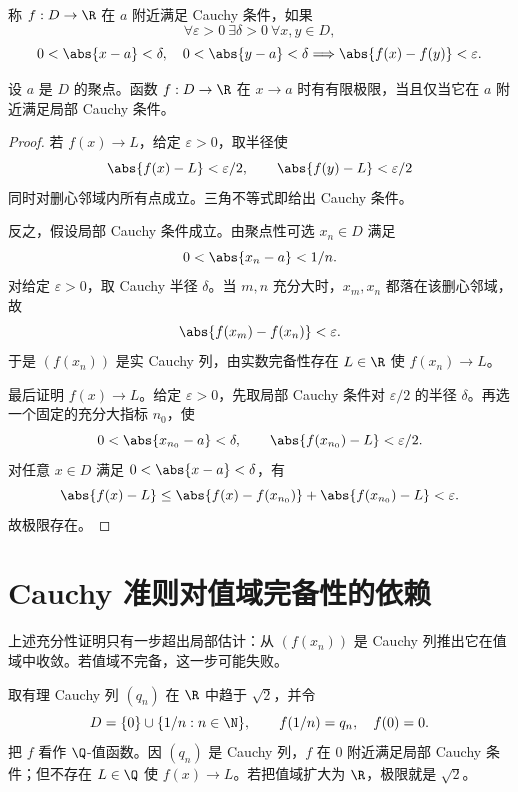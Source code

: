 \begin{definition}[局部 Cauchy 条件]
称 \(f:D\to\R\) 在 \(a\) 附近满足 Cauchy 条件，如果
\[
 \forall\varepsilon>0\ \exists\delta>0\ \forall x,y\in D,
\]
\[
 0<\abs{x-a}<\delta,\quad0<\abs{y-a}<\delta
 \Longrightarrow\abs{f(x)-f(y)}<\varepsilon.
\]
\end{definition}

\begin{theorem}
设 \(a\) 是 \(D\) 的聚点。函数 \(f:D\to\R\) 在 \(x\to a\) 时有有限极限，当且仅当它在 \(a\) 附近满足局部 Cauchy 条件。
\end{theorem}

\begin{proof}
若 \(f(x)\to L\)，给定 \(\varepsilon>0\)，取半径使
\[
 \abs{f(x)-L}<\varepsilon/2,\qquad
 \abs{f(y)-L}<\varepsilon/2
\]
同时对删心邻域内所有点成立。三角不等式即给出 Cauchy 条件。

反之，假设局部 Cauchy 条件成立。由聚点性可选 \(x_n\in D\) 满足
\[
 0<\abs{x_n-a}<1/n.
\]
对给定 \(\varepsilon>0\)，取 Cauchy 半径 \(\delta\)。当 \(m,n\) 充分大时，\(x_m,x_n\) 都落在该删心邻域，故
\[
 \abs{f(x_m)-f(x_n)}<\varepsilon.
\]
于是 \((f(x_n))\) 是实 Cauchy 列，由实数完备性存在 \(L\in\R\) 使 \(f(x_n)\to L\)。

最后证明 \(f(x)\to L\)。给定 \(\varepsilon>0\)，先取局部 Cauchy 条件对 \(\varepsilon/2\) 的半径 \(\delta\)。再选一个固定的充分大指标 \(n_0\)，使
\[
 0<\abs{x_{n_0}-a}<\delta,\qquad
 \abs{f(x_{n_0})-L}<\varepsilon/2.
\]
对任意 \(x\in D\) 满足 \(0<\abs{x-a}<\delta\)，有
\[
 \abs{f(x)-L}
 \le\abs{f(x)-f(x_{n_0})}+\abs{f(x_{n_0})-L}
 <\varepsilon.
\]
故极限存在。
\end{proof}

\section{Cauchy 准则对值域完备性的依赖}

上述充分性证明只有一步超出局部估计：从 \((f(x_n))\) 是 Cauchy 列推出它在值域中收敛。若值域不完备，这一步可能失败。

\begin{counterexample}[有理值函数]
取有理 Cauchy 列 \((q_n)\) 在 \(\R\) 中趋于 \(\sqrt2\)，并令
\[
 D=\{0\}\cup\{1/n:n\in\N\},\qquad f(1/n)=q_n,\quad f(0)=0.
\]
把 \(f\) 看作 \(\Q\)-值函数。因 \((q_n)\) 是 Cauchy 列，\(f\) 在 \(0\) 附近满足局部 Cauchy 条件；但不存在 \(L\in\Q\) 使 \(f(x)\to L\)。若把值域扩大为 \(\R\)，极限就是 \(\sqrt2\)。
\end{counterexample}

